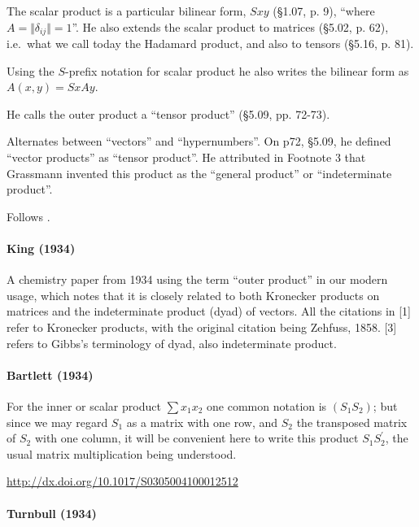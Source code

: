 The scalar product is a particular bilinear form, $S x y$ (\S 1.07, p. 9),
``where $A = \Vert \delta_{ij} \Vert = 1$''. He also extends the scalar product
to matrices (\S 5.02, p. 62), i.e.\ what we call today the Hadamard product, and
also to tensors (\S 5.16, p. 81).

Using the $S$-prefix notation for scalar product he also writes the bilinear
form as $A(x, y) = SxAy$.

He calls the outer product a ``tensor product'' (\S 5.09, pp. 72-73).

Alternates between ``vectors'' and ``hypernumbers''. On p72, \S 5.09, he
defined ``vector products'' as ``tensor product''. He attributed in Footnote 3
that Grassmann invented this product as the ``general product'' or
``indeterminate product''.

Follows \cite{Scheffers1889}.



\paragraph{King (1934)}

A chemistry paper from 1934 using the term ``outer product'' in
our modern usage, which notes that it is closely related to both Kronecker
products on matrices and the indeterminate product (dyad) of vectors. All the
citations in [1] refer to Kronecker products, with the original citation being
Zehfuss, 1858. [3] refers to Gibbs's terminology of dyad, also indeterminate
product.



\paragraph{Bartlett (1934)}

For the
inner or scalar product $\sum x_1 x_2 $
 one common notation is $(S_1 S_2)$; but
since we may regard $S_1$ as a matrix with one row, and $S_2$ the
transposed matrix of $S_2$ with one column, it will be convenient here
to write this product $S_1 S_2^\prime$, the usual matrix multiplication being
understood.

\url{http://dx.doi.org/10.1017/S0305004100012512}



\paragraph{Turnbull (1934)}

